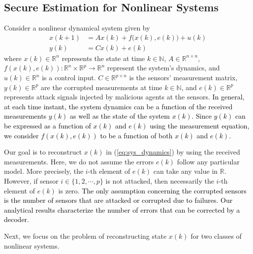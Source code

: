 \subsection{Secure Estimation for Nonlinear Systems}\label{sec:nonlinear_estimation}
Consider a nonlinear dynamical system given by
\begin{equation}\label{eq:sys_dynamics}
\begin{aligned}
	x(k+1) &= A x (k) + f\big(x(k),e(k)\big) + u(k) \\
	y(k) &= C x(k) + e(k)
\end{aligned}
\end{equation}
where $x(k)\in \mathbb{R}^n$ represents the state at time $k\in
\mathbb{N}$, $A \in \mathbb{R}^{n\times n}$, $f(x(k),e(k)): \mathbb{R}^n \times \mathbb{R}^p \rightarrow \mathbb{R}^n$ represent the system's dynamics, and $u(k) \in \mathbb{R}^n$ is a control input. $C \in \mathbb{R}^{p\times n}$ is the sensors' measurement matrix, $y(k) \in \mathbb{R}^p$ are the corrupted measurements at time $k\in\mathbb{N}$, and $e(k)\in \mathbb{R}^p$ represents attack signals injected by malicious agents at the sensors. \textcolor{black}{In general, at each time instant, the system dynamics can be a function of the received measurements $y(k)$ as well as the state of the system $x(k)$. Since $y(k)$ can be expressed as a function of $x(k)$ and $e(k)$ using the measurement equation, we consider $f(x(k),e(k))$ to be a function of both $x(k)$ and $e(k)$.}



Our goal is to reconstruct $x(k)$ in (\ref{eq:sys_dynamics}) by using the received measurements. Here, we do not assume the errors $e(k)$ follow any particular model. More precisely, the $i$-th element of $e(k)$ can take any value in $\mathbb{R}$. However, if sensor $i\in \{1,2,\cdots,p\}$ is not attacked, then necessarily the $i$-th element of $e(k)$ is zero. \textcolor{black}{The only assumption concerning the corrupted sensors is the number of sensors that are attacked or corrupted due to failures. Our analytical results characterize the number of errors that can be corrected by a decoder.}


Next, we focus on the problem of reconstructing state $x(k)$ for two classes of nonlinear systems. %


